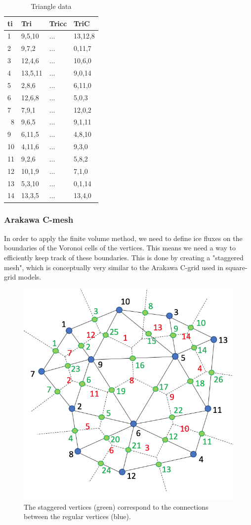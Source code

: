 \documentclass{article}
\begin{document}
\begin{table}[H] \label{tab:table_triangledata_01}
  \begin{center}
    \caption{Triangle data}
    \begin{tabular}{l|l|l|l}
      \textbf{ti} & \textbf{Tri} & \textbf{Tricc} & \textbf{TriC}\\
      \hline
      1 & 9,5,10 & ... & 13,12,8\\
      2 & 9,7,2 & ... & 0,11,7\\
      3 & 12,4,6 & ... & 10,6,0\\
      4 & 13,5,11 & ... & 9,0,14\\
      5 & 2,8,6 & ... & 6,11,0\\
      6 & 12,6,8 & ... & 5,0,3\\
      7 & 7,9,1 & ... & 12,0,2\\\
      8 & 9,6,5 & ... & 9,1,11\\
      9 & 6,11,5 & ... & 4,8,10\\
      10 & 4,11,6 & ... & 9,3,0\\
      11 & 9,2,6 & ... & 5,8,2\\
      12 & 10,1,9 & ... & 7,1,0\\
      13 & 5,3,10 & ... & 0,1,14\\
      14 & 13,3,5 & ... & 13,4,0\\
    \end{tabular}
  \end{center}
\end{table}

\subsubsection{Arakawa C-mesh}

In order to apply the finite volume method, we need to define ice fluxes on the boundaries of the Voronoi cells of the vertices. This means we need a way to efficiently keep track of these boundaries. This is done by creating a "staggered mesh", which is conceptually very similar to the Arakawa C-grid used in square-grid models.

\begin{figure}[H] \label{fig:staggeredmesh}
  \includegraphics[width=0.5\linewidth]{Fig_staggeredmesh.png}
  \caption{The staggered vertices (green) correspond to the connections between the regular vertices (blue).}
\end{figure}
\end{document}
